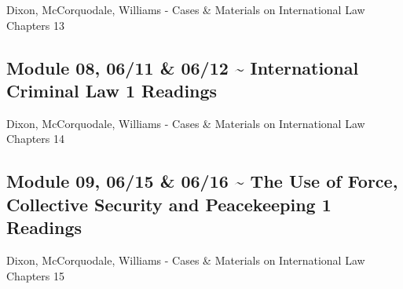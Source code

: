 \documentclass[10pt,]{article}
\begin{document}
Dixon, McCorquodale, Williams - Cases \& Materials on International Law
Chapters 13

\hypertarget{module-08-0611-0612-international-criminal-law-1-readings}{%
\subsection{Module 08, 06/11 \& 06/12 \textasciitilde{} International
Criminal Law \textbar{} 1
Readings}\label{module-08-0611-0612-international-criminal-law-1-readings}}

Dixon, McCorquodale, Williams - Cases \& Materials on International Law
Chapters 14

\hypertarget{module-09-0615-0616-the-use-of-force-collective-security-and-peacekeeping-1-readings}{%
\subsection{Module 09, 06/15 \& 06/16 \textasciitilde{} The Use of
Force, Collective Security and Peacekeeping \textbar{} 1
Readings}\label{module-09-0615-0616-the-use-of-force-collective-security-and-peacekeeping-1-readings}}

Dixon, McCorquodale, Williams - Cases \& Materials on International Law
Chapters 15
\end{document}
